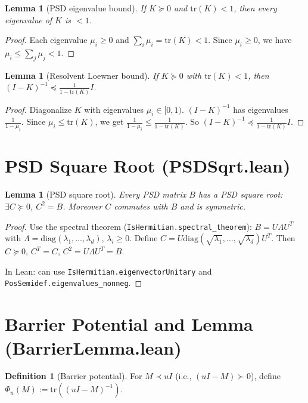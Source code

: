 \documentclass{article}
\newtheorem{lemma}[theorem]{Lemma}
\theoremstyle{definition}
\newtheorem{definition}[theorem]{Definition}
\begin{document}
\begin{lemma}[PSD eigenvalue bound]\label{lem:eigbound}
If $K \succeq 0$ and $\mathrm{tr}(K) < 1$, then every eigenvalue of $K$ is $< 1$.
\end{lemma}
\begin{proof}
Each eigenvalue $\mu_i \ge 0$ and $\sum_i \mu_i = \mathrm{tr}(K) < 1$.
Since $\mu_i \ge 0$, we have $\mu_i \le \sum_j \mu_j < 1$.
\end{proof}

\begin{lemma}[Resolvent Loewner bound]\label{lem:resolvent}
If $K \succeq 0$ with $\mathrm{tr}(K) < 1$, then
$(I - K)^{-1} \preceq \frac{1}{1 - \mathrm{tr}(K)} I$.
\end{lemma}
\begin{proof}
Diagonalize $K$ with eigenvalues $\mu_i \in [0,1)$.
$(I-K)^{-1}$ has eigenvalues $\frac{1}{1-\mu_i}$.
Since $\mu_i \le \mathrm{tr}(K)$, we get $\frac{1}{1-\mu_i} \le \frac{1}{1-\mathrm{tr}(K)}$.
So $(I-K)^{-1} \preceq \frac{1}{1-\mathrm{tr}(K)} I$.
\end{proof}

\section{PSD Square Root (PSDSqrt.lean)}

\begin{lemma}[PSD square root]\label{lem:sqrt}
Every PSD matrix $B$ has a PSD square root: $\exists C \succeq 0$, $C^2 = B$.
Moreover $C$ commutes with $B$ and is symmetric.
\end{lemma}
\begin{proof}
Use the spectral theorem (\texttt{IsHermitian.spectral\_theorem}):
$B = U \Lambda U^T$ with $\Lambda = \mathrm{diag}(\lambda_1, \ldots, \lambda_d)$, $\lambda_i \ge 0$.
Define $C = U \mathrm{diag}(\sqrt{\lambda_1}, \ldots, \sqrt{\lambda_d}) U^T$.
Then $C \succeq 0$, $C^T = C$, $C^2 = U \Lambda U^T = B$.

In Lean: can use \texttt{IsHermitian.eigenvectorUnitary} and
\texttt{PosSemidef.eigenvalues\_nonneg}.
\end{proof}

\section{Barrier Potential and Lemma (BarrierLemma.lean)}

\begin{definition}[Barrier potential]
For $M \prec uI$ (i.e., $(uI - M) \succ 0$), define
$\Phi_u(M) := \mathrm{tr}((uI - M)^{-1})$.
\end{definition}
\end{document}
